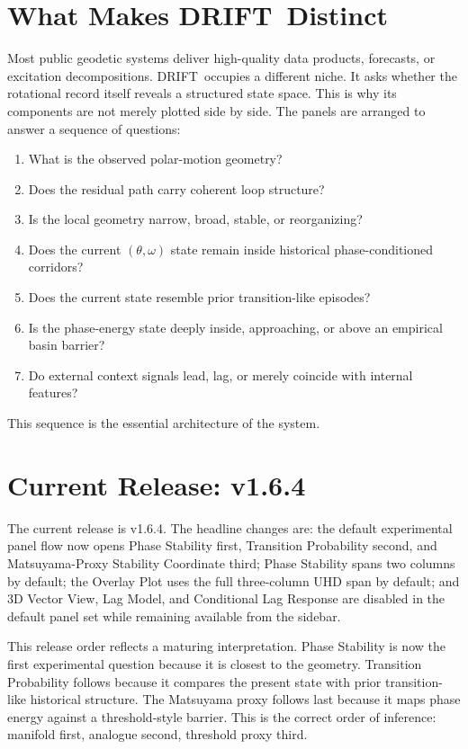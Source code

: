 \documentclass[11pt]{article}
\newcommand{\DRIFT}{\textsc{DRIFT}}
\begin{document}
\section{What Makes \DRIFT\ Distinct}
Most public geodetic systems deliver high-quality data products, forecasts, or excitation decompositions. \DRIFT\ occupies a different niche. It asks whether the rotational record itself reveals a structured state space. This is why its components are not merely plotted side by side. The panels are arranged to answer a sequence of questions:
\begin{enumerate}
\item What is the observed polar-motion geometry?
\item Does the residual path carry coherent loop structure?
\item Is the local geometry narrow, broad, stable, or reorganizing?
\item Does the current \((\theta,\omega)\) state remain inside historical phase-conditioned corridors?
\item Does the current state resemble prior transition-like episodes?
\item Is the phase-energy state deeply inside, approaching, or above an empirical basin barrier?
\item Do external context signals lead, lag, or merely coincide with internal features?
\end{enumerate}
This sequence is the essential architecture of the system.

\section{Current Release: v1.6.4}
The current release is v1.6.4. The headline changes are: the default experimental panel flow now opens Phase Stability first, Transition Probability second, and Matsuyama-Proxy Stability Coordinate third; Phase Stability spans two columns by default; the Overlay Plot uses the full three-column UHD span by default; and 3D Vector View, Lag Model, and Conditional Lag Response are disabled in the default panel set while remaining available from the sidebar.

This release order reflects a maturing interpretation. Phase Stability is now the first experimental question because it is closest to the geometry. Transition Probability follows because it compares the present state with prior transition-like historical structure. The Matsuyama proxy follows last because it maps phase energy against a threshold-style barrier. This is the correct order of inference: manifold first, analogue second, threshold proxy third.
\end{document}
